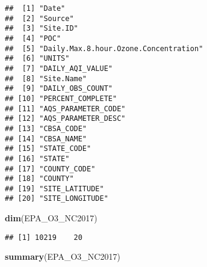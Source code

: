 \documentclass[]{article}
\newenvironment{Shaded}{\begin{snugshade}}{\end{snugshade}}
\newcommand{\KeywordTok}[1]{\textcolor[rgb]{0.13,0.29,0.53}{\textbf{#1}}}
\newcommand{\NormalTok}[1]{#1}
\begin{document}
\begin{verbatim}
##  [1] "Date"                                
##  [2] "Source"                              
##  [3] "Site.ID"                             
##  [4] "POC"                                 
##  [5] "Daily.Max.8.hour.Ozone.Concentration"
##  [6] "UNITS"                               
##  [7] "DAILY_AQI_VALUE"                     
##  [8] "Site.Name"                           
##  [9] "DAILY_OBS_COUNT"                     
## [10] "PERCENT_COMPLETE"                    
## [11] "AQS_PARAMETER_CODE"                  
## [12] "AQS_PARAMETER_DESC"                  
## [13] "CBSA_CODE"                           
## [14] "CBSA_NAME"                           
## [15] "STATE_CODE"                          
## [16] "STATE"                               
## [17] "COUNTY_CODE"                         
## [18] "COUNTY"                              
## [19] "SITE_LATITUDE"                       
## [20] "SITE_LONGITUDE"
\end{verbatim}

\begin{Shaded}
\begin{Highlighting}[]
\KeywordTok{dim}\NormalTok{(EPA_O3_NC2017)}
\end{Highlighting}
\end{Shaded}

\begin{verbatim}
## [1] 10219    20
\end{verbatim}

\begin{Shaded}
\begin{Highlighting}[]
\KeywordTok{summary}\NormalTok{(EPA_O3_NC2017)}
\end{Highlighting}
\end{Shaded}
\end{document}
